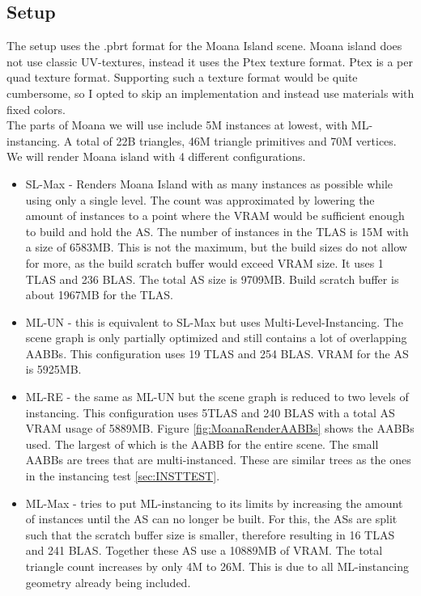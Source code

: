 \subsection{Setup}
The setup uses the .pbrt format for the Moana Island scene. Moana island does not use classic UV-textures, instead it uses the Ptex texture format. Ptex is a per quad texture format. Supporting such a texture format would be quite cumbersome, so I opted to skip an implementation and instead use materials with fixed colors.\\
The parts of Moana we will use include 5M instances at lowest, with ML-instancing. A total of 22B triangles, 46M triangle primitives and 70M vertices. We will render Moana island with 4 different configurations.
\begin{itemize}
    \item SL-Max - Renders Moana Island with as many instances as possible while using only a single level. The count was approximated by lowering the amount of instances to a point where the VRAM would be sufficient enough to build and hold the AS. The number of instances in the TLAS is 15M with a size of 6583MB. This is not the maximum, but the build sizes do not allow for more, as the build scratch buffer would exceed VRAM size. It uses 1 TLAS and 236 BLAS. The total AS size is 9709MB. Build scratch buffer is about 1967MB for the TLAS.
    \item ML-UN - this is equivalent to SL-Max but uses Multi-Level-Instancing. The scene graph is only partially optimized and still contains a lot of overlapping AABBs. This configuration uses 19 TLAS and 254 BLAS. VRAM for the AS is 5925MB.
    \item ML-RE - the same as ML-UN but the scene graph is reduced to two levels of instancing. This configuration uses 5TLAS and 240 BLAS with a total AS VRAM usage of 5889MB. Figure \ref{fig:MoanaRenderAABBs} shows the AABBs used. The largest of which is the AABB for the entire scene. The small AABBs are trees that are multi-instanced. These are similar trees as the ones in the instancing test \ref{sec:INSTTEST}.
    \item ML-Max - tries to put ML-instancing to its limits by increasing the amount of instances until the AS can no longer be built. For this, the ASs are split such that the scratch buffer size is smaller, therefore resulting in 16 TLAS and 241 BLAS. Together these AS use a 10889MB of VRAM. The total triangle count increases by only 4M to 26M. This is due to all ML-instancing geometry already being included.
\end{itemize}
